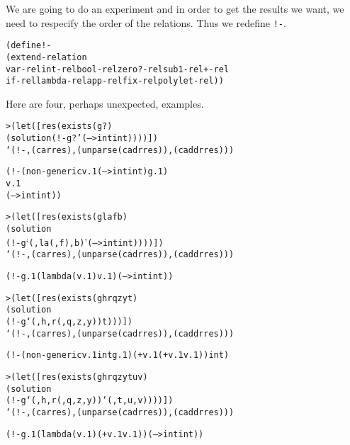 We are going to do an experiment and in order to get the results
we want, we need to respecify the order of the relations.  Thus
we redefine \texttt{!-}.

\begin{alltt}
(define !-
  (extend-relation
    var-rel int-rel bool-rel zero?-rel sub1-rel +-rel 
    if-rel lambda-rel app-rel fix-rel polylet-rel))
\end{alltt}

Here are four, perhaps unexpected, examples.

\begin{alltt}
> (let ([res (exists (g ?)
               (solution (!- g ? '(--> int int))))])
    `(!- ,(car res) ,(unparse (cadr res)) ,(caddr res)))

(!- (non-generic v.1 (--> int int) g.1)
    v.1
    (--> int int))
\end{alltt}

\begin{alltt}
> (let ([res (exists (g la f b)
               (solution
                 (!- g `(,la (,f) ,b) '(--> int int))))])
    `(!- ,(car res) ,(unparse (cadr res)) ,(caddr res)))

(!- g.1 (lambda (v.1) v.1) (--> int int))
\end{alltt}

\begin{alltt}
> (let ([res (exists (g h r q z y t)
               (solution 
                  (!- g `(,h ,r (,q ,z ,y)) t)))])
    `(!- ,(car res) ,(unparse (cadr res)) ,(caddr res)))

(!- (non-generic v.1 int g.1) (+ v.1 (+ v.1 v.1)) int)
\end{alltt}

\begin{alltt}
> (let ([res (exists (g h r q z y t u v)
               (solution
                 (!- g `(,h ,r (,q ,z ,y)) `(,t ,u ,v))))])
    `(!- ,(car res) ,(unparse (cadr res)) ,(caddr res)))

(!- g.1 (lambda (v.1) (+ v.1 v.1)) (--> int int))
\end{alltt}

